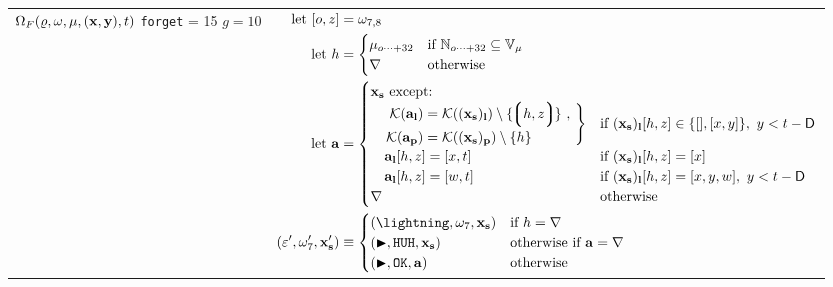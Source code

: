 \begin{longtable}{p{3.5cm} p{12.5cm}}
  \cmidrule(lr){1-1}\cmidrule(lr){2-2}
  \makecell*[l]{
  $\Omega_F(\varrho, \omega, \mu, (\mathbf{x}, \mathbf{y}), t)$ \\
  \texttt{forget} = 15 \\
  $g = 10$} &
  $\begin{aligned}
    \using [o, z] &= \registers_{7, 8} \\
    \using h &= \begin{cases}
      \memory_{o\dots+32} &\when \mathbb{N}_{o \dots+ 32} \subseteq \mathbb{V}_{\memory} \\
      \error &\otherwise
    \end{cases} \\
    \using \mathbf{a} &= \begin{cases}
      \mathbf{x}_\mathbf{s} \text{ except:} &\\
      \quad \left.
        \begin{aligned}
          \keys{\mathbf{a}_\mathbf{l}} &= \keys{(\mathbf{x}_\mathbf{s})_\mathbf{l}} \setminus \{\tup{h, z}\}\ ,\\[2pt]
          \keys{\mathbf{a}_\mathbf{p}} &= \keys{(\mathbf{x}_\mathbf{s})_\mathbf{p}} \setminus \{h\}
        \end{aligned}
      \ \right\} &\when (\mathbf{x}_\mathbf{s})_\mathbf{l}[h, z] \in \{[], [x, y]\},\ y < t - \mathsf{D} \\
      \quad \mathbf{a}_\mathbf{l}[h, z] = [x, t] &\when (\mathbf{x}_\mathbf{s})_\mathbf{l}[h, z] = [x] \\
      \quad \mathbf{a}_\mathbf{l}[h, z] = [w, t] &\when (\mathbf{x}_\mathbf{s})_\mathbf{l}[h, z] = [x, y, w],\ y < t - \mathsf{D} \\
      \error &\otherwise\\
    \end{cases} \\
    (\execst', \registers'_7, \mathbf{x}'_\mathbf{s}) &\equiv \begin{cases}
      (\panic, \registers_7, \mathbf{x}_\mathbf{s}) &\when h = \error \\
      (\continue, \mathtt{HUH}, \mathbf{x}_\mathbf{s}) &\otherwhen \mathbf{a} = \error \\
      (\continue, \mathtt{OK}, \mathbf{a}) &\otherwise \\
    \end{cases} \\
  \end{aligned}$\\
  \cmidrule(lr){1-1}\cmidrule(lr){2-2}

\end{longtable}

